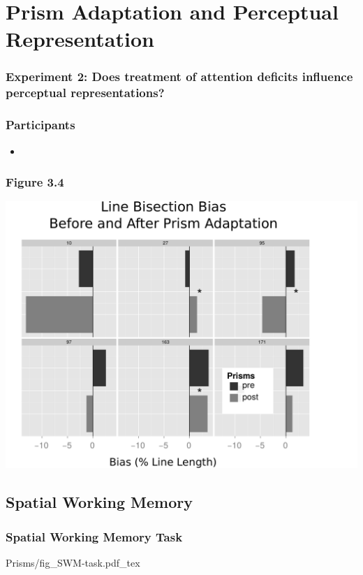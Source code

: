 \documentclass{beamer}
\begin{document}
\section[Prisms]{Prism Adaptation and Perceptual Representation}

\begin{frame}
	\frametitle{Experiment 2: Does treatment of attention deficits influence perceptual representations?}
		\tableofcontents[currentsection]
\end{frame}


\begin{frame}
	\frametitle{Participants}
\begin{itemize}
	\item 
\end{itemize}
\end{frame}



\subsection*{Spatial Working Memory}

\begin{frame}
	\frametitle{Spatial Working Memory Task}
	\def\svgwidth{0.7\textwidth}
	{Prisms/fig_SWM-task.pdf_tex}
\end{frame}
\end{document}
